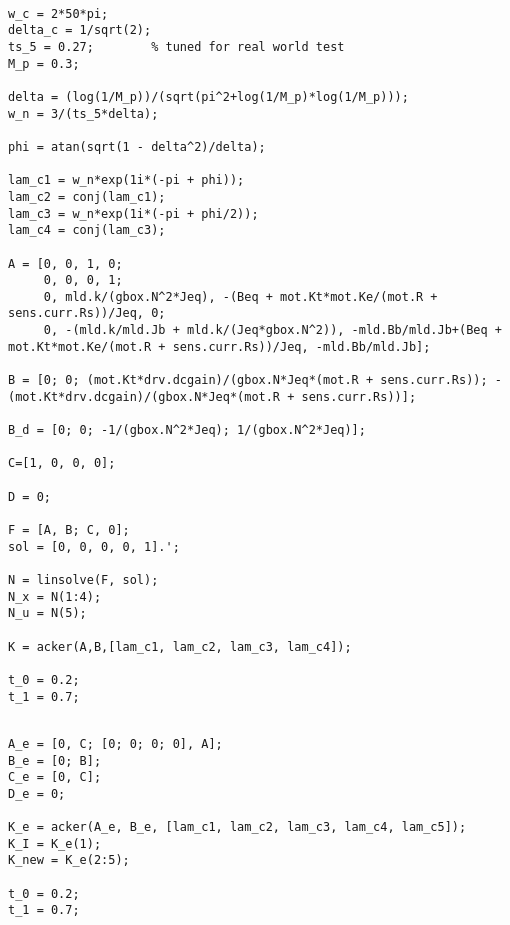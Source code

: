 \begin{lstlisting}[caption={Nominal State Space Controller Design Code.},label={lst:statespace_design}]
%% Nominal State Space Controller Design

w_c = 2*50*pi;
delta_c = 1/sqrt(2);
ts_5 = 0.27;        % tuned for real world test
M_p = 0.3;

delta = (log(1/M_p))/(sqrt(pi^2+log(1/M_p)*log(1/M_p)));
w_n = 3/(ts_5*delta);

phi = atan(sqrt(1 - delta^2)/delta);

lam_c1 = w_n*exp(1i*(-pi + phi));
lam_c2 = conj(lam_c1);
lam_c3 = w_n*exp(1i*(-pi + phi/2));
lam_c4 = conj(lam_c3);

A = [0, 0, 1, 0; 
     0, 0, 0, 1; 
     0, mld.k/(gbox.N^2*Jeq), -(Beq + mot.Kt*mot.Ke/(mot.R + sens.curr.Rs))/Jeq, 0;
     0, -(mld.k/mld.Jb + mld.k/(Jeq*gbox.N^2)), -mld.Bb/mld.Jb+(Beq + mot.Kt*mot.Ke/(mot.R + sens.curr.Rs))/Jeq, -mld.Bb/mld.Jb];

B = [0; 0; (mot.Kt*drv.dcgain)/(gbox.N*Jeq*(mot.R + sens.curr.Rs)); -(mot.Kt*drv.dcgain)/(gbox.N*Jeq*(mot.R + sens.curr.Rs))];

B_d = [0; 0; -1/(gbox.N^2*Jeq); 1/(gbox.N^2*Jeq)];

C=[1, 0, 0, 0];

D = 0;

F = [A, B; C, 0];
sol = [0, 0, 0, 0, 1].';

N = linsolve(F, sol);
N_x = N(1:4);
N_u = N(5);

K = acker(A,B,[lam_c1, lam_c2, lam_c3, lam_c4]);

t_0 = 0.2;
t_1 = 0.7;
\end{lstlisting}
\begin{lstlisting}[caption={Nominal State Space Controller with Integral Action Design Code.},label={lst:statespace_robust_design}]
%% Nominal State Space Controller with Integral Action Design

A_e = [0, C; [0; 0; 0; 0], A];
B_e = [0; B];
C_e = [0, C];
D_e = 0;

K_e = acker(A_e, B_e, [lam_c1, lam_c2, lam_c3, lam_c4, lam_c5]);
K_I = K_e(1);
K_new = K_e(2:5);

t_0 = 0.2;
t_1 = 0.7;
\end{lstlisting}
\pagebreak